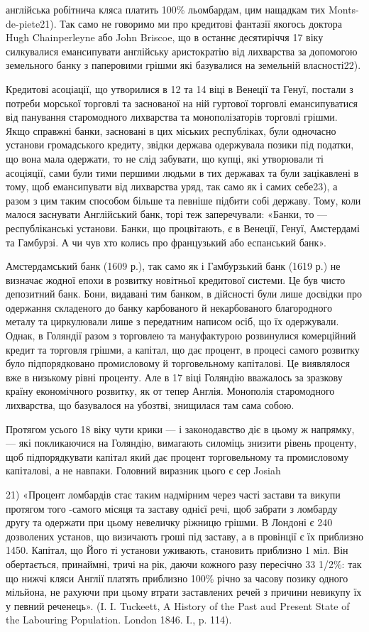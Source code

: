 англійська робітнича кляса платить 100\% льомбардам, цим нащадкам тих Monts-de-piete21).
Так само не говоримо ми про кредитові фантазії якогось доктора
Hugh Chainperleyne або John Briscoe, що в останнє десятиріччя 17 віку силкувалися
емансипувати англійську аристократію від лихварства за допомогою
земельного банку з паперовими грішми які базувалися на земельній власності22).

Кредитові асоціації, що утворилися в 12 та 14 віці в Венеції та Генуї,
постали з потреби морської торговлі та заснованої на ній гуртової торговлі
емансипуватися від панування старомодного лихварства та монополізаторів
торговлі грішми. Якщо справжні банки, засновані в цих міських республіках,
були одночасно установи громадського кредиту, звідки держава одержувала позики
під податки, що вона мала одержати, то не слід забувати, що купці, які утворювали
ті асоціяції, сами були тими першими людьми в тих державах та були
зацікавлені в тому, щоб емансипувати від лихварства уряд, так само як і самих
себе23), а разом з цим таким способом більше та певніше підбити собі державу.
Тому, коли малося заснувати Англійський банк, торі теж заперечували: «Банки,
то — республіканські установи. Банки, що процвітають, є в Венеції, Генуї,
Амстердамі та Гамбурзі. А чи чув хто колись про французький або еспанський
банк».

Амстердамський банк (1609 р.), так само як і Гамбурзький банк (1619 р.)
не визначає жодної епохи в розвитку новітньої кредитової системи. Це був
чисто депозитний банк. Бони, видавані тим банком, в дійсності були лише
досвідки про одержання складеного до банку карбованого й некарбованого благородного
металу та циркулювали лише з передатним написом осіб, що їх одержували.
Однак, в Голяндії разом з торговлею та мануфактурою розвинулися
комерційний кредит та торговля грішми, а капітал, що дає процент, в процесі
самого розвитку було підпорядковано промисловому й торговельному капіталові.
Це виявлялося вже в низькому рівні проценту. Але в 17 віці Голяндію вважалось
за зразкову країну економічного розвитку, як от тепер Англія. Монополія
старомодного лихварства, що базувалося на убозтві, знищилася там сама собою.

Протягом усього 18 віку чути крики — і законодавство діє в цьому ж напрямку,
— які покликаючися на Голяндію, вимагають силоміць знизити рівень
проценту, щоб підпорядкувати капітал який дає процент торговельному та
промисловому капіталові, а не навпаки. Головний виразник цього є сер Josiah

21) «Процент ломбардів стає таким надмірним через часті застави та викупи протягом того
-самого місяця та заставу однієї речі, щоб забрати з ломбарду другу та одержати при цьому невеличку
ріжницю грішми. В Лондоні є 240 дозволених установ, що визичають гроші під заставу, а в провінції
є їх приблизно 1450. Капітал, що Його ті установи уживають, становить приблизно 1 міл. Він
обертається,
принаймні, тричі на рік, даючи кожного разу пересічно 33 1/2\%: так що нижчі кляси
Англії платять приблизно 100\% річно за часову позику одного мільйона, не рахуючи при цьому втрати
заставлених речей з причини невикупу їх у певний реченець». (I. I. Tuckeett, A History of the Past
aud Present State of the Labouring Population. London 1846. I., p. 114).

